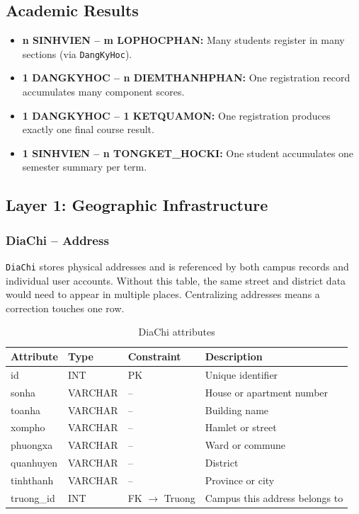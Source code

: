\documentclass[12pt,a4paper]{report}
\begin{document}
\subsection*{Academic Results}
\begin{itemize}
  \item \textbf{n SINHVIEN -- m LOPHOCPHAN:} Many students register in many sections (via \texttt{DangKyHoc}).
  \item \textbf{1 DANGKYHOC -- n DIEMTHANHPHAN:} One registration record accumulates many component scores.
  \item \textbf{1 DANGKYHOC -- 1 KETQUAMON:} One registration produces exactly one final course result.
  \item \textbf{1 SINHVIEN -- n TONGKET\_HOCKI:} One student accumulates one semester summary per term.
\end{itemize}

\subsection{Layer 1: Geographic Infrastructure}

\subsubsection{DiaChi -- Address}

\texttt{DiaChi} stores physical addresses and is referenced by both campus records and individual user accounts. Without this table, the same street and district data would need to appear in multiple places. Centralizing addresses means a correction touches one row.

\begin{table}[H]
\renewcommand{\arraystretch}{1.35}
\caption{DiaChi attributes}
\label{tab:diachi}
\begin{tabular}{|p{3cm}|p{2.5cm}|p{2.5cm}|p{5.5cm}|}
  \hline
  \textbf{Attribute} & \textbf{Type} & \textbf{Constraint} & \textbf{Description} \\
  \hline
  id & INT & PK & Unique identifier \\
  \hline
  sonha & VARCHAR & -- & House or apartment number \\
  \hline
  toanha & VARCHAR & -- & Building name \\
  \hline
  xompho & VARCHAR & -- & Hamlet or street \\
  \hline
  phuongxa & VARCHAR & -- & Ward or commune \\
  \hline
  quanhuyen & VARCHAR & -- & District \\
  \hline
  tinhthanh & VARCHAR & -- & Province or city \\
  \hline
  truong\_id & INT & FK $\to$ Truong & Campus this address belongs to \\
  \hline
\end{tabular}
\end{table}
\end{document}
